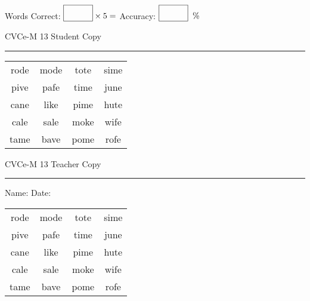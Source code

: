 \documentclass{memoir}
\begin{document}
\small

Words Correct: $\fbox{\phantom{\huge 100}} \times 5 = $ Accuracy: $\fbox{\phantom{\huge 100}}\;\; \%$ 

\vfill

\newpage


\footnotesize \noindent
CVCe-M 13 \hfill Student Copy
\smallskip
\hrule

\Large

\setlength{\tabcolsep}{14pt}
\def\arraystretch{2}

{\selectfont


\begin{vplace}[0.5]
\begin{center}
\begin{tabular}{cccc}
rode & mode & tote & sime \\
pive & pafe & time & june \\
cane & like & pime & hute \\
cale & sale & moke & wife \\
tame & bave & pome & rofe \\
\end{tabular}
\end{center}
\end{vplace}

}

\newpage

\footnotesize \noindent
CVCe-M 13 \hfill Teacher Copy
\smallskip
\hrule

\small

\vfill

\noindent
Name: \underline{\hspace{1.75in}} \hfill Date: \underline{\hspace{1in}}

\Large

{\selectfont


\begin{vplace}[0.5]
\begin{center}
\begin{tabular}{cccc}
rode & mode & tote & sime \\
pive & pafe & time & june \\
cane & like & pime & hute \\
cale & sale & moke & wife \\
tame & bave & pome & rofe \\
\end{tabular}
\end{center}
\end{vplace}



}
\end{document}
